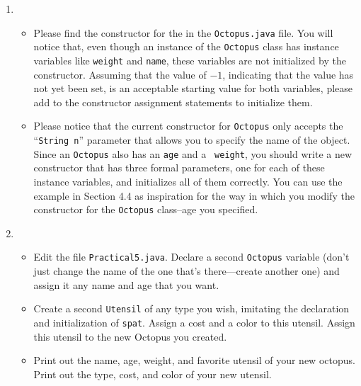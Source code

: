 \begin{enumerate}
\item 

\begin{itemize}


  \item Please find the constructor for the in the {\tt Octopus.java} file.  You will notice that, even though an
    instance of the {\tt Octopus} class has instance variables like {\tt weight} and {\tt name}, these variables are not
    initialized by the constructor. Assuming that the value of $-1$, indicating that the value has not yet been set, is
    an acceptable starting value for both variables, please add to the constructor assignment statements to initialize
    them.
    

  \item Please notice that the current constructor for {\tt Octopus} only accepts the ``{\tt String n}'' parameter that
    allows you to specify the name of the object.  Since an {\tt Octopus} also has an {\tt age} and a {\tt
      weight}, you should write a new constructor that has three formal parameters, one for each of these instance
    variables, and initializes all of them correctly. You can use the example in Section 4.4 as inspiration for the way
    in which you modify the constructor for the {\tt Octopus} class--age you specified.

\end{itemize} 


\item 
\begin{itemize}
\item
Edit the file {\tt Practical5.java}. Declare a second {\tt Octopus} variable (don't
just change the name of the one that's there---create another one) and
assign it any name and age that you want. 
\item
\noindent Create a second {\tt Utensil} of any type you wish, imitating the declaration and
initialization of {\tt spat}.
Assign a cost and a color to this utensil. Assign this utensil to the new
Octopus you created. 
\item
\noindent Print out the name, age, weight, and favorite utensil of your new octopus.
Print out the type, cost, and color of your new utensil.
\end{itemize}
\end{enumerate}

